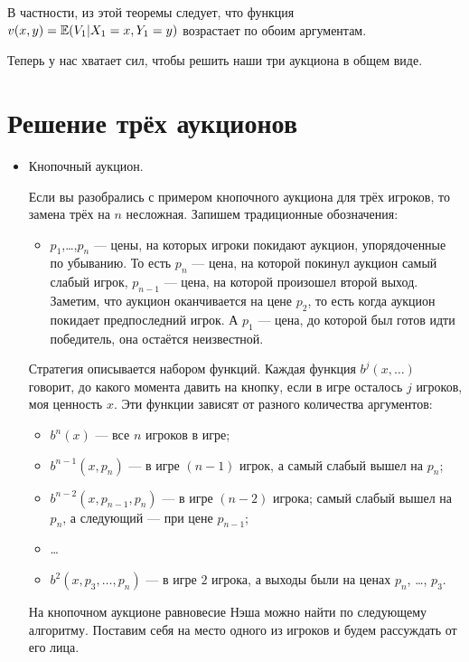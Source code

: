 В частности, из этой теоремы следует, что функция $ v(x,y)=\operatorname{\mathbb{E}}(V_{1}|X_{1}=x, Y_{1}=y) $ возрастает по обоим аргументам.


Теперь у нас хватает сил, чтобы решить наши три аукциона в общем виде.

\section{Решение трёх аукционов}

\begin{itemize}
\item Кнопочный аукцион.

Если вы разобрались с примером кнопочного аукциона для трёх игроков, то замена трёх на $ n $ несложная. Запишем традиционные обозначения:

\begin{itemize}
\item $ p_{1} $,\ldots,$ p_{n} $ — цены, на которых игроки покидают аукцион, упорядоченные по убыванию. То есть $ p_{n} $ — цена, на которой покинул аукцион самый слабый игрок, $ p_{n-1} $ — цена, на которой произошел второй выход. Заметим, что аукцион оканчивается на цене $ p_{2} $, то есть когда аукцион покидает предпоследний игрок. А $ p_{1} $ — цена, до которой был готов идти победитель, она остаётся неизвестной.
\end{itemize}


Стратегия описывается набором функций. Каждая функция $b^j(x, \ldots)$ говорит, до какого момента давить на кнопку, если в игре осталось $j$ игроков, моя ценность $ x $. Эти функции зависят от разного количества аргументов:
\begin{itemize}
\item $ b^{n}(x) $ — все $ n $ игроков в игре;
\item $ b^{n-1}(x,p_{n}) $ — в игре $ (n-1) $ игрок, а самый слабый вышел на $ p_{n} $;
\item $ b^{n-2}(x,p_{n-1},p_{n}) $ —  в игре $ (n-2) $ игрока; самый слабый вышел на $ p_{n} $, а следующий — при цене $ p_{n-1} $;
\item \ldots
\item $ b^{2}(x,p_{3},\ldots,p_{n}) $ — в игре $ 2 $ игрока, а выходы были на ценах $p_{n}$, \ldots, $ p_{3} $.
\end{itemize}

На кнопочном аукционе равновесие Нэша можно найти по следующему алгоритму. Поставим себя на место одного из игроков и будем рассуждать от его лица.


\end{itemize}
